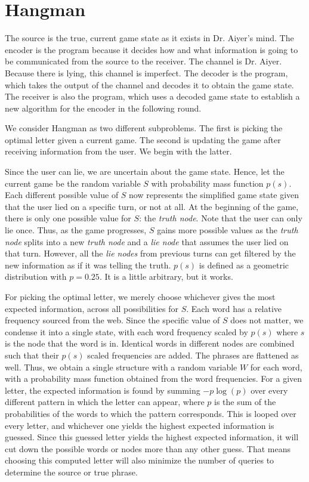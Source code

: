 \documentclass[conference,letterpaper]{IEEEtran}
\begin{document}
\section{Hangman}

The source is the true, current game state as it exists in Dr. Aiyer's mind.
The encoder is the program because it decides how and what information is going to be communicated from the source to the receiver.
The channel is Dr. Aiyer. Because there is lying, this channel is imperfect.
The decoder is the program, which takes the output of the channel and decodes it to obtain the game state.
The receiver is also the program, which uses a decoded game state to establish a new algorithm for the encoder in the following round.


We consider Hangman as two different subproblems. The first is picking the optimal letter given a current game. The second is updating the game after receiving information from the user. We begin with the latter.

Since the user can lie, we are uncertain about the game state. Hence, let the current game be the random variable $S$ with probability mass function $p(s)$. Each different possible value of $S$ now represents the simplified game state given that the user lied on a specific turn, or not at all. At the beginning of the game, there is only one possible value for $S$: the \textit{truth node}. Note that the user can only lie once. Thus, as the game progresses, $S$ gains more possible values as the \textit{truth node} splits into a new \textit{truth node} and a \textit{lie node} that assumes the user lied on that turn. However, all the \textit{lie nodes} from previous turns can get filtered by the new information as if it was telling the truth. $p(s)$ is defined as a geometric distribution with $p=0.25$. It is a little arbitrary, but it works.

For picking the optimal letter, we merely choose whichever gives the most expected information, across all possibilities for $S$. Each word has a relative frequency sourced from the web. Since the specific value of $S$ does not matter, we condense it into a single state, with each word frequency scaled by $p(s)$ where $s$ is the node that the word is in. Identical words in different nodes are combined such that their $p(s)$ scaled frequencies are added. The phrases are flattened as well. Thus, we obtain a single structure with a random variable $W$ for each word, with a probability mass function obtained from the word frequencies. For a given letter, the expected information is found by summing $-p \log(p)$ over every different pattern in which the letter can appear, where $p$ is the sum of the probabilities of the words to which the pattern corresponds. This is looped over every letter, and whichever one yields the highest expected information is guessed. Since this guessed letter yields the highest expected information, it will cut down the possible words or nodes more than any other guess. That means choosing this computed letter will also minimize the number of queries to determine the source or true phrase.

\end{document}
